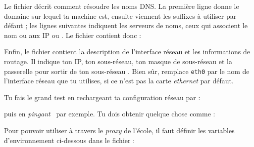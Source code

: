 
Le fichier  d\'ecrit comment r\'esoudre les noms DNS. La premi\`ere ligne donne le domaine sur lequel ta machine est, ensuite
viennent les suffixes \`a utiliser par d\'efaut ; les lignes suivantes indiquent les serveurs de noms, ceux qui associent le nom  ou
 aux IP  ou . Le fichier contient donc :

\noindent {}

Enfin, le fichier  contient la description de l'interface r\'eseau et les informations de routage. Il indique ton IP, ton
sous-r\'eseau, ton masque de sous-r\'eseau et la passerelle pour sortir de ton sous-r\'eseau . Bien s\^ur, remplace \texttt{eth0} par le nom de l'interface
r\'eseau que tu utilises, si ce n'est pas la carte \emph{ethernet} par d\'efaut.

\noindent {}

Tu fais le grand test en rechargeant ta configuration r\'eseau par :


puis en \emph{pingant} \fkz\ par exemple. Tu dois obtenir quelque chose comme :


\label{gentoo_mirror} Pour pouvoir utiliser  \`a travers le \emph{proxy} de l'\'ecole, il faut d\'efinir les variables d'environnement
ci-dessous dans le fichier  :


